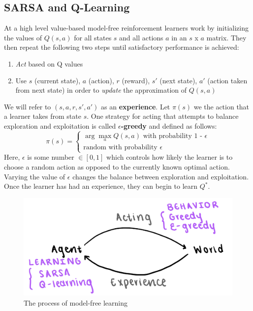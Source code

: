 \subsection{SARSA and Q-Learning}
At a high level value-based model-free reinforcement learners work by initializing the values of $Q(s, a)$ for all states $s$ and all actions $a$ in an $s$ x $a$ matrix. They then repeat the following two steps until satisfactory performance is achieved: 
\begin{enumerate}
    \item \textit{Act} based on Q values
    \item Use $s$ (current state), $a$ (action), $r$ (reward), $s'$ (next state), $a'$ (action taken from next state) in order to \textit{update} the approximation of $Q(s, a)$
\end{enumerate} 
We will refer to $(s, a, r, s', a')$ as an \textbf{experience}. Let $\pi(s)$ we the action that a learner takes from state $s$. One strategy for acting that attempts to balance exploration and exploitation is called $\epsilon$\textbf{-greedy} and defined as follows:
\begin{equation}
    \pi(s) = 
    \begin{cases} 
      \arg\!\max_aQ(s, a) \text{ with probability 1 - }\epsilon \\
      \text{random with probability }\epsilon
    \end{cases}
\end{equation}
Here, $\epsilon$ is some number $\in [0, 1]$ which controls how likely the learner is to choose a random action as opposed to the currently known optimal action. Varying the value of $\epsilon$ changes the balance between exploration and exploitation.\\
Once the learner has had an experience, they can begin to learn $Q^*$. 
\begin{figure}[ht!]
    \centering
    \includegraphics[scale=0.2]{../ReinforcementLearning/fig/model-free.jpeg}
    \caption{The process of model-free learning}
\end{figure}
